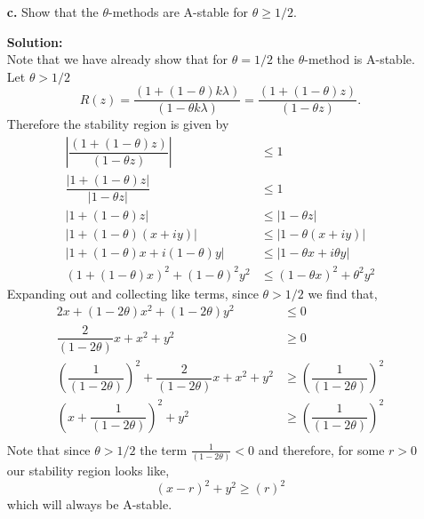 \documentclass[12pt]{article}
\makeatletter
\theoremstyle{homework}
\newenvironment{exercise}[1]
{\def\@currentlabel{#1}\exercisecore}
{\endexercisecore}
\newcommand{\localhead}[1]{\par\smallskip\noindent\textbf{#1}\nobreak\\}%
\newcommand\solution{\localhead{Solution:}}
\makeatother
\begin{document}
\begin{exercise}{Problem P30}
\begin{enumerate}
    \item[\textbf{c.}] Show that the $\theta$-methods are A-stable for $\theta \geq 1/2$. 
    \solution Note that we have already show that for $\theta = 1/2$ the $\theta$-method is A-stable. Let $\theta > 1/2$
    \begin{equation*}
      R(z) = \dfrac{(1 + (1 - \theta)k\lambda)}{ (1 - \theta k\lambda) } = \dfrac{(1 + (1 - \theta)z)}{ (1 - \theta z) }.
    \end{equation*}
    Therefore the stability region is given by 
    \begin{align*}
      \left|\dfrac{(1 + (1 - \theta)z)}{ (1 - \theta z) }\right|&\leq 1\\
      \dfrac{\left|1 + (1 - \theta)z\right|}{\left|1 - \theta z \right|}&\leq 1\\
      \left|1 + (1 - \theta)z\right|&\leq \left|1 - \theta z \right|\\
      \left|1 + (1 - \theta)(x + iy)\right|&\leq \left|1 - \theta(x + iy) \right|\\
      \left|1 + (1 - \theta)x + i(1 - \theta)y\right|&\leq \left|1 - \theta x + i\theta y \right|\\
      (1 + (1 - \theta)x)^2 + (1 - \theta)^2y^2 &\leq (1 - \theta x)^2 + \theta^2 y^2 
    \end{align*}
    Expanding out and collecting like terms, since $\theta > 1/2$ we find that, 
    \begin{align*}
      2x + (1 - 2\theta)x^2 + (1 - 2\theta)y^2 &\leq 0\\
      \dfrac{2}{(1 - 2\theta)}x + x^2 + y^2 &\geq 0\\      
      \left(\dfrac{1}{(1 - 2\theta)}\right)^2 + \dfrac{2}{(1 - 2\theta)}x + x^2 + y^2 &\geq \left(\dfrac{1}{(1 - 2\theta)}\right)^2\\
      \left(x + \dfrac{1}{(1 - 2\theta)}\right)^2 + y^2 &\geq \left(\dfrac{1}{(1 - 2\theta)}\right)^2\\ 
    \end{align*}
    Note that since $\theta > 1/2$ the term $\frac{1}{(1 - 2\theta)} < 0$ and therefore, for some $r > 0$ our stability region looks like, 
    \begin{equation*}
      \left(x  - r\right)^2 + y^2 \geq \left(r\right)^2
    \end{equation*}
    which will always be A-stable. 
  \end{enumerate} 
\end{exercise}
\vspace{.15in}
\end{document}
